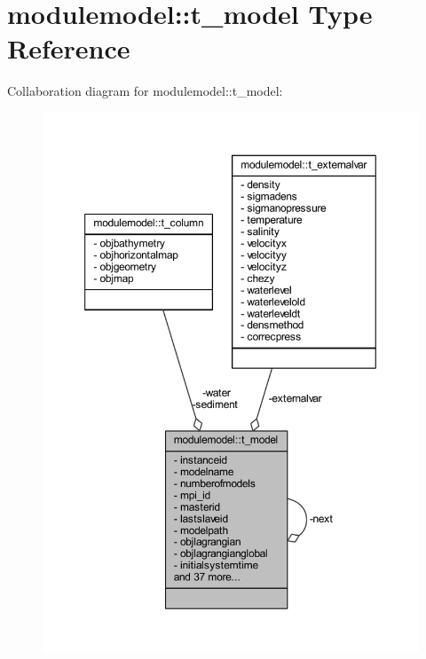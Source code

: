 \hypertarget{structmodulemodel_1_1t__model}{}\section{modulemodel\+:\+:t\+\_\+model Type Reference}
\label{structmodulemodel_1_1t__model}


Collaboration diagram for modulemodel\+:\+:t\+\_\+model\+:\nopagebreak
\begin{figure}[H]
\begin{center}
\leavevmode
\includegraphics[width=350pt]{structmodulemodel_1_1t__model__coll__graph}
\end{center}
\end{figure}
